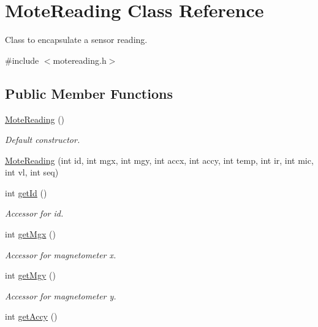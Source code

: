 \hypertarget{classMoteReading}{
\section{MoteReading Class Reference}
\label{classMoteReading}
}


Class to encapsulate a sensor reading.  




{\ttfamily \#include $<$motereading.h$>$}

\subsection*{Public Member Functions}
\begin{DoxyCompactItemize}
\item 
\hyperlink{classMoteReading_ad2555254ab4fd4ce31ebafeea362d255}{MoteReading} ()
\begin{DoxyCompactList}\small\item\em Default constructor. \item\end{DoxyCompactList}\item 
\hyperlink{classMoteReading_a1ccca01ed95b7a3091e9de29acc99350}{MoteReading} (int id, int mgx, int mgy, int accx, int accy, int temp, int ir, int mic, int vl, int seq)
\item 
int \hyperlink{classMoteReading_a123a08348d6a1ba80a4055cb5f5afaa6}{getId} ()
\begin{DoxyCompactList}\small\item\em Accessor for id. \item\end{DoxyCompactList}\item 
int \hyperlink{classMoteReading_a318b7e6afba062ee3df207495070e277}{getMgx} ()
\begin{DoxyCompactList}\small\item\em Accessor for magnetometer x. \item\end{DoxyCompactList}\item 
int \hyperlink{classMoteReading_a4344f67449dbd79febac0c4795b185f4}{getMgy} ()
\begin{DoxyCompactList}\small\item\em Accessor for magnetometer y. \item\end{DoxyCompactList}\item 
int \hyperlink{classMoteReading_af918c7ca6c9fea98a3d608b61dbaffae}{getAccy} ()

\end{DoxyCompactItemize}
